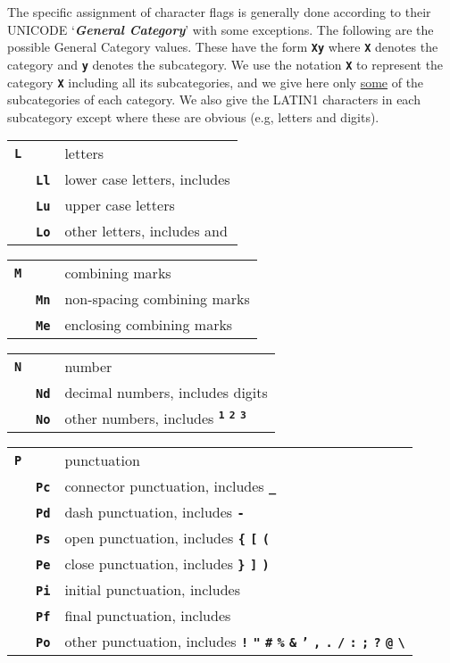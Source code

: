 \documentclass[12pt]{article}
\newcommand{\TT}[1]{{\tt \bfseries #1}}
\newcommand{\key}[1]{{\bf \em #1}\index{#1}}
\newenvironment{indpar}[1][0.3in]%
	{\begin{list}{}%
		     {\setlength{\itemsep}{0in}%
		      \setlength{\topsep}{0in}%
		      \setlength{\parsep}{1ex}%
		      \setlength{\labelwidth}{#1}%
		      \setlength{\leftmargin}{#1}%
		      \addtolength{\leftmargin}{\labelsep}}%
	 \item}%
	{\end{list}}
\begin{document}
The specific assignment of character flags is generally done
according to their
UNICODE `\key{General Category}' with some exceptions.
The following are the possible General Category values.
These have the form \TT{Xy} where \TT{X} denotes the category
and \TT{y} denotes the subcategory.  We use the notation
\TT{X} to represent the category \TT{X} including all its
subcategories, and we give here only \underline{some} of the
subcategories of each category.  We also give the LATIN1 characters
in each subcategory except where these are obvious (e.g, letters
and digits).
\begin{indpar}
\begin{tabular}{ll}
\TT{L}		& letters \\
~~~\TT{Ll}	& lower case letters, includes \TT{\textmu} \\
~~~\TT{Lu}	& upper case letters \\
~~~\TT{Lo}	& other letters, includes
                  \TT{\textordmasculine} and \TT{\textordfeminine} \\
\end{tabular}

\begin{tabular}{ll}
\TT{M}		& combining marks \\
~~~\TT{Mn}	& non-spacing combining marks \\
~~~\TT{Me}	& enclosing combining marks \\
\end{tabular}

\begin{tabular}{ll}
\TT{N}		& number \\
~~~\TT{Nd}	& decimal numbers, includes digits \\
~~~\TT{No}	& other numbers, includes
                  \TT{\textsuperscript{1}}
                  \TT{\textsuperscript{2}}
		  \TT{\textsuperscript{3}}
		  \TT{\textonequarter}
		  \TT{\textonehalf}
		  \TT{\textthreequarters} \\
\end{tabular}

\begin{tabular}{ll}
\TT{P}		& punctuation \\
~~~\TT{Pc}	& connector punctuation, includes \TT{\_} \\
~~~\TT{Pd}	& dash punctuation, includes \TT{-} \\
~~~\TT{Ps}	& open punctuation, includes \TT{\{} \TT{[} \TT{(} \\
~~~\TT{Pe}	& close punctuation, includes \TT{\}} \TT{]} \TT{)} \\
~~~\TT{Pi}	& initial punctuation, includes \TT{\guillemotleft} \\
~~~\TT{Pf}	& final punctuation, includes \TT{\guillemotright} \\
~~~\TT{Po}	& other punctuation, includes
                  \TT{!} \TT{"} \TT{\#} \TT{\%} \TT{\&} \TT{'} \TT{*}
		  \TT{,} \TT{.} \TT{/} \TT{:} \TT{;} \TT{?} \TT{@}
		  \TT{\textbackslash}
		  \TT{\textexclamdown}
		  \TT{\textsection}
		  \TT{\textpilcrow}
		  \TT{\textperiodcentered}
		  \TT{\textquestiondown} \\
\end{tabular}


\end{indpar}
\end{document}
